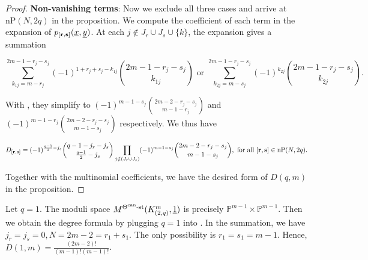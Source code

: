 \documentclass[11pt]{article}
\begin{document}
\begin{proof}
    \textbf{Non-vanishing terms}: Now we exclude all three cases and arrive at \(\mathrm{nP}(N, 2q)\) in the proposition. We compute the coefficient of each term in the expansion of \(p_{[\mathbf{r}, \mathbf{s}]}(\underline{x}, \underline{y})\). At each \(j\notin J_r\cup J_s\cup \{k\}\), the expansion gives a summation 

    \[\sum_{k_{1j} = m-r_j}^{2m-1-r_j-s_j}(-1)^{1+r_j+s_j-k_{1j}}\binom{2m-1-r_j-s_j}{k_{1j}} \text{ or } \sum_{k_{2j}=m-s_j}^{2m-1-r_j-s_j}(-1)^{k_{2j}}\binom{2m-1-r_j-s_j}{k_{2j}}.\]

    With , they simplify to \((-1)^{m-1-s_j}\binom{2m-2-r_j-s_j}{m-1-r_j}\) and \((-1)^{m-1-r_j}\binom{2m-2-r_j-s_j}{m-1-s_j}\) respectively. We thus have 

    \[
    D_{[\mathbf{r}, \mathbf{s}]} = (-1)^{\frac{q-1}{2}-j_s}\binom{q-1-j_r-j_s}{\frac{q-1}{2}-j_s}\prod_{j\notin (J_r\cup J_s)}(-1)^{m-1-s_j}\binom{2m-2-r_j-s_j}{m-1-s_j}, \text{ for all } [\mathbf{r}, \mathbf{s}]\in \mathrm{nP}(N, 2q).
    \]

    Together with the multinomial coefficients, we have the desired form of \(D(q, m)\) in the proposition. 

\end{proof}

\begin{example}
    Let \(q = 1\). The moduli space \( M^{\Theta^{\text{can}}\text{-st}}(K_{(2,q)}^m, \underline{1})\) is precisely \(\mathbb{P}^{m-1}\times \mathbb{P}^{m-1}\). Then we obtain the degree formula by plugging \(q = 1\) into . In the summation, we have \(j_r = j_s = 0, N = 2m-2 = r_1 + s_1\). The only possibility is \(r_1 = s_1 = m-1\). Hence, \(D(1, m) = \frac{(2m-2)!}{(m-1)!(m-1)!}\).
\end{example}
\end{document}
